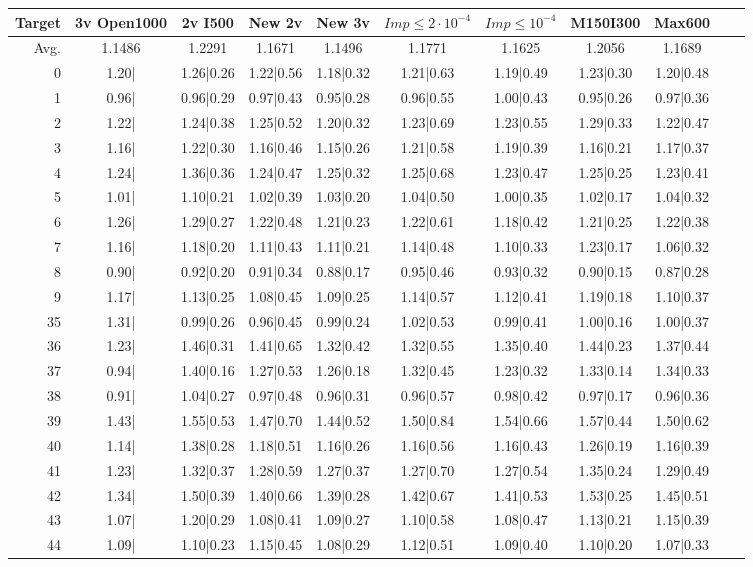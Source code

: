 \begin{table}
	\begin{tabular}{|r||c|c|c|c|c|c|c|c|c|c|}
\hline
Target & 3v Open1000 & 2v I500 & New 2v & New 3v & $Imp\leq 2\cdot 10^{-4}$ & $Imp\leq 10^{-4}$ & M150I300  & Max600  \\\hline
Avg. & 1.1486 & 1.2291 & 1.1671 & 1.1496 & 1.1771 & 1.1625 & 1.2056 & 1.1689  \\\hline
0 &1.20| &1.26|0.26 &1.22|0.56 &1.18|0.32 &1.21|0.63 &1.19|0.49 &1.23|0.30 &1.20|0.48  \\\hline
1 &0.96| &0.96|0.29 &0.97|0.43 &0.95|0.28 &0.96|0.55 &1.00|0.43 &0.95|0.26 &0.97|0.36  \\\hline
2 &1.22| &1.24|0.38 &1.25|0.52 &1.20|0.32 &1.23|0.69 &1.23|0.55 &1.29|0.33 &1.22|0.47  \\\hline
3 &1.16| &1.22|0.30 &1.16|0.46 &1.15|0.26 &1.21|0.58 &1.19|0.39 &1.16|0.21 &1.17|0.37  \\\hline
4 &1.24| &1.36|0.36 &1.24|0.47 &1.25|0.32 &1.25|0.68 &1.23|0.47 &1.25|0.25 &1.23|0.41  \\\hline
5 &1.01| &1.10|0.21 &1.02|0.39 &1.03|0.20 &1.04|0.50 &1.00|0.35 &1.02|0.17 &1.04|0.32  \\\hline
6 &1.26| &1.29|0.27 &1.22|0.48 &1.21|0.23 &1.22|0.61 &1.18|0.42 &1.21|0.25 &1.22|0.38  \\\hline
7 &1.16| &1.18|0.20 &1.11|0.43 &1.11|0.21 &1.14|0.48 &1.10|0.33 &1.23|0.17 &1.06|0.32  \\\hline
8 &0.90| &0.92|0.20 &0.91|0.34 &0.88|0.17 &0.95|0.46 &0.93|0.32 &0.90|0.15 &0.87|0.28  \\\hline
9 &1.17| &1.13|0.25 &1.08|0.45 &1.09|0.25 &1.14|0.57 &1.12|0.41 &1.19|0.18 &1.10|0.37  \\\hline
35 &1.31| &0.99|0.26 &0.96|0.45 &0.99|0.24 &1.02|0.53 &0.99|0.41 &1.00|0.16 &1.00|0.37  \\\hline
36 &1.23| &1.46|0.31 &1.41|0.65 &1.32|0.42 &1.32|0.55 &1.35|0.40 &1.44|0.23 &1.37|0.44  \\\hline
37 &0.94| &1.40|0.16 &1.27|0.53 &1.26|0.18 &1.32|0.45 &1.23|0.32 &1.33|0.14 &1.34|0.33  \\\hline
38 &0.91| &1.04|0.27 &0.97|0.48 &0.96|0.31 &0.96|0.57 &0.98|0.42 &0.97|0.17 &0.96|0.36  \\\hline
39 &1.43| &1.55|0.53 &1.47|0.70 &1.44|0.52 &1.50|0.84 &1.54|0.66 &1.57|0.44 &1.50|0.62  \\\hline
40 &1.14| &1.38|0.28 &1.18|0.51 &1.16|0.26 &1.16|0.56 &1.16|0.43 &1.26|0.19 &1.16|0.39  \\\hline
41 &1.23| &1.32|0.37 &1.28|0.59 &1.27|0.37 &1.27|0.70 &1.27|0.54 &1.35|0.24 &1.29|0.49  \\\hline
42 &1.34| &1.50|0.39 &1.40|0.66 &1.39|0.28 &1.42|0.67 &1.41|0.53 &1.53|0.25 &1.45|0.51  \\\hline
43 &1.07| &1.20|0.29 &1.08|0.41 &1.09|0.27 &1.10|0.58 &1.08|0.47 &1.13|0.21 &1.15|0.39  \\\hline
44 &1.09| &1.10|0.23 &1.15|0.45 &1.08|0.29 &1.12|0.51 &1.09|0.40 &1.10|0.20 &1.07|0.33  \\\hline
	\end{tabular}
\end{table}

